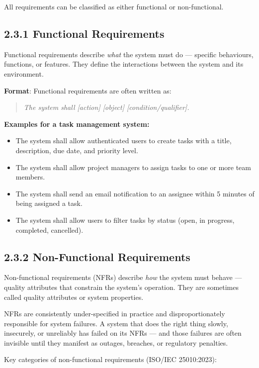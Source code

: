 \documentclass[11pt,a4paper]{book}
\begin{document}
All requirements can be classified as either functional or non-functional.

\subsection{2.3.1 Functional Requirements}

Functional requirements describe \textit{what} the system must do --- specific behaviours, functions, or features. They define the interactions between the system and its environment.

\textbf{Format}: Functional requirements are often written as:
\begin{quote}
\textit{The system shall [action] [object] [condition/qualifier].}
\end{quote}

\textbf{Examples for a task management system:}

\begin{itemize}
  \item The system shall allow authenticated users to create tasks with a title, description, due date, and priority level.
  \item The system shall allow project managers to assign tasks to one or more team members.
  \item The system shall send an email notification to an assignee within 5 minutes of being assigned a task.
  \item The system shall allow users to filter tasks by status (open, in progress, completed, cancelled).
\end{itemize}

\subsection{2.3.2 Non-Functional Requirements}

Non-functional requirements (NFRs) describe \textit{how} the system must behave --- quality attributes that constrain the system's operation. They are sometimes called quality attributes or system properties.

NFRs are consistently under-specified in practice and disproportionately responsible for system failures. A system that does the right thing slowly, insecurely, or unreliably has failed on its NFRs --- and those failures are often invisible until they manifest as outages, breaches, or regulatory penalties.

Key categories of non-functional requirements (ISO/IEC 25010:2023):
\end{document}
